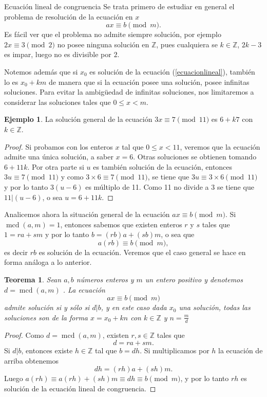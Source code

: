 \documentclass[11pt,spanish,makeidx]{amsbook}
\newtheorem{teorema}{Teorema}[section]
\theoremstyle{definition}
\newtheorem{ejemplo}{Ejemplo}[section]
\theoremstyle{remark}
\newcommand \mcd{\operatorname{mcd}}
\begin{document}
\begin{section}{Ecuación lineal de congruencia}
Se trata primero de estudiar en general el problema de resolución de la ecuación en $x$
\begin{equation}\label{ecuacionlineal}
 ax \equiv b \pmod{m}.
\end{equation}
Es fácil ver que el problema no admite siempre solución, por ejemplo $2x\equiv 3 \pmod{2}$ no posee ninguna solución en $\mathbb Z$, pues cualquiera se $k \in \mathbb Z$, $2k-3$ es impar, luego no es divisible por $2$.

Notemos además que si $x_0$ es solución de la ecuación (\ref{ecuacionlineal}), también lo es $x_0+km$ de manera que si la ecuación posee una solución, posee infinitas soluciones. Para evitar la ambigüedad de infinitas soluciones, nos limitaremos a considerar las soluciones tales que $0\le x < m$.

\begin{ejemplo} La solución general de la ecuación $3x\equiv 7
\pmod{11}$ es $6+k7$ con $k \in \mathbb Z$.
\end{ejemplo}
\begin{proof} Si probamos con los enteros $x$ tal que  $0\le x < 11$, veremos que la ecuación admite una única solución, a saber $x=6$. Otras soluciones se obtienen tomando $6+11k$. Por otra parte si $u$ es también solución de la ecuación, entonces $3u\equiv 7 \pmod{11}$ y  como   $3 \times 6 \equiv 7 \pmod{11}$, se tiene que $3u \equiv 3\times 6 \pmod{11}$ y por lo tanto $3(u-6)$ es múltiplo de 11. Como 11 no divide a 3 se tiene que $11|(u-6)$, o sea $u=6+11k$.
\end{proof}

Analicemos ahora la situación general de la ecuación $ ax\equiv b \pmod{m}$. Si $\mcd(a,m)=1$, entonces sabemos que existen enteros $r$ y $s$ tales que $1=ra+sm$ y por lo tanto $b=(rb)a +(sb)m$, o sea que
$$
a(rb) \equiv b \pmod{m},
$$
es decir $rb$ es solución de la ecuación. Veremos que el caso general se hace en forma análoga a lo anterior.

\begin{teorema}\label{th-elc} Sean $a,b$ números enteros y $m$ un entero positivo y denotemos $d = \mcd(a,m)$ . La  ecuación 
\begin{equation}\label{eq-elc}
ax \equiv b \pmod{m}
\end{equation}
admite solución si y sólo si $d|b$, y en este caso dada $x_0$ una solución, todas las soluciones son de la forma $x = x_0 + k n$ con $k \in \mathbb Z$ y $n = \displaystyle{\frac{m}{d}}$ 
\end{teorema}
\begin{proof} Como $d =\mcd(a,m)$, existen $r,s \in \mathbb Z$ tales que
$$
d = ra+sm.
$$
Si $d|b$, entonces existe $h\in \mathbb Z$ tal que $b = dh$. Si multiplicamos por $h$ la ecuación de arriba obtenemos
$$
dh = (rh)a+(sh)m.
$$
Luego $a(rh) \equiv a(rh)+(sh)m \equiv dh \equiv b \pmod{m}$, y por lo tanto $rh$ es solución de la ecuación lineal de congruencia.    


\end{proof}
\end{section}
\end{document}
